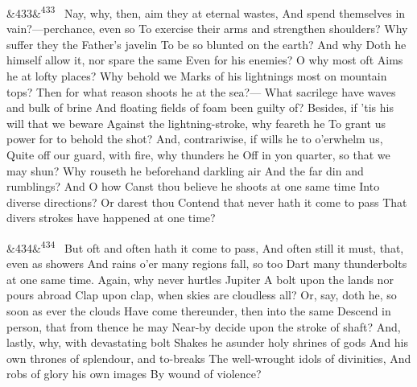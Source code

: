 \documentclass[12pt]{article}
\newcommand{\para}[1][]{\par\noindent\ifx&#1&\else\textsuperscript{\footnotesize #1}~\fi}
\begin{document}
\para[433] Nay, why, then, aim they at eternal wastes, And spend themselves in vain?---perchance, even so To exercise their arms and strengthen shoulders? Why suffer they the Father's javelin To be so blunted on the earth? And why Doth he himself allow it, nor spare the same Even for his enemies? O why most oft Aims he at lofty places? Why behold we Marks of his lightnings most on mountain tops? Then for what reason shoots he at the sea?--- What sacrilege have waves and bulk of brine And floating fields of foam been guilty of? Besides, if 'tis his will that we beware Against the lightning-stroke, why feareth he To grant us power for to behold the shot? And, contrariwise, if wills he to o'erwhelm us, Quite off our guard, with fire, why thunders he Off in yon quarter, so that we may shun? Why rouseth he beforehand darkling air And the far din and rumblings? And O how Canst thou believe he shoots at one same time Into diverse directions? Or darest thou Contend that never hath it come to pass That divers strokes have happened at one time?

\para[434] But oft and often hath it come to pass, And often still it must, that, even as showers And rains o'er many regions fall, so too Dart many thunderbolts at one same time. Again, why never hurtles Jupiter A bolt upon the lands nor pours abroad Clap upon clap, when skies are cloudless all? Or, say, doth he, so soon as ever the clouds Have come thereunder, then into the same Descend in person, that from thence he may Near-by decide upon the stroke of shaft? And, lastly, why, with devastating bolt Shakes he asunder holy shrines of gods And his own thrones of splendour, and to-breaks The well-wrought idols of divinities, And robs of glory his own images By wound of violence?
\end{document}
